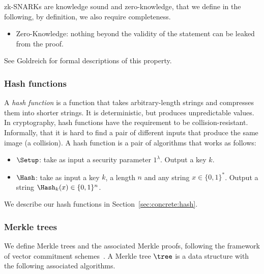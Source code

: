 
zk-SNARKs are knowledge sound and zero-knowledge, that we define in the following, by definition, we also require completeness.
\begin{itemize}
	\item Zero-Knowledge: nothing beyond the validity of the statement can be leaked from the proof.
\end{itemize}

See Goldreich for formal descriptions of this property.

\subsubsection{Hash functions}

A \emph{hash function} is a function that takes arbitrary-length strings and compresses them into shorter strings.  It is deterministic, but produces unpredictable values. In cryptography, hash functions have the requirement to be collision-resistant. Informally, that it is hard to find a pair of different inputs that produce the same image (a collision). A hash function is a pair of algorithms that works as follows:
\begin{itemize}
	\item $\Setup$: take as input a security parameter $1^{\lambda}$. Output a key $k$.  
	\item ${\Hash}$: take as input a key $k$, a length $n$ and any string $x \in \{0,1 \}^*$. Output a string $\Hash_k(x) \in \{0,1\}^{n}$.
\end{itemize}

We describe our hash functions in Section~\ref{sec:concrete:hash}.

\subsubsection{Merkle trees}


We define Merkle trees and the associated Merkle proofs, following the framework of vector commitment schemes~\cite{catalano2013vector,benarroch2021zero}. A Merkle tree $\tree$ is a data structure with the following associated algorithms.

